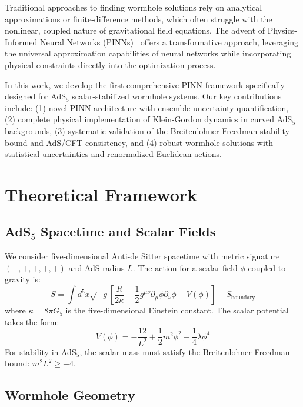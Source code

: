 \documentclass[aps,prd,twocolumn,showpacs,superscriptaddress]{revtex4-1}
\begin{document}
Traditional approaches to finding wormhole solutions rely on analytical approximations or finite-difference methods, which often struggle with the nonlinear, coupled nature of gravitational field equations. The advent of Physics-Informed Neural Networks (PINNs)~\cite{Raissi2019} offers a transformative approach, leveraging the universal approximation capabilities of neural networks while incorporating physical constraints directly into the optimization process.

In this work, we develop the first comprehensive PINN framework specifically designed for AdS$_5$ scalar-stabilized wormhole systems. Our key contributions include: (1) novel PINN architecture with ensemble uncertainty quantification, (2) complete physical implementation of Klein-Gordon dynamics in curved AdS$_5$ backgrounds, (3) systematic validation of the Breitenlohner-Freedman stability bound and AdS/CFT consistency, and (4) robust wormhole solutions with statistical uncertainties and renormalized Euclidean actions.

\section{Theoretical Framework}

\subsection{AdS$_5$ Spacetime and Scalar Fields}

We consider five-dimensional Anti-de Sitter spacetime with metric signature $(-,+,+,+,+)$ and AdS radius $L$. The action for a scalar field $\phi$ coupled to gravity is:
%
\begin{equation}
S = \int d^5x \sqrt{-g} \left[ \frac{R}{2\kappa} - \frac{1}{2}g^{\mu\nu}\partial_\mu\phi\partial_\nu\phi - V(\phi) \right] + S_{\text{boundary}}
\end{equation}
%
where $\kappa = 8\pi G_5$ is the five-dimensional Einstein constant. The scalar potential takes the form:
%
\begin{equation}
V(\phi) = -\frac{12}{L^2} + \frac{1}{2}m^2\phi^2 + \frac{1}{4}\lambda\phi^4
\end{equation}
%
For stability in AdS$_5$, the scalar mass must satisfy the Breitenlohner-Freedman bound: $m^2L^2 \geq -4$.

\subsection{Wormhole Geometry}
\end{document}
